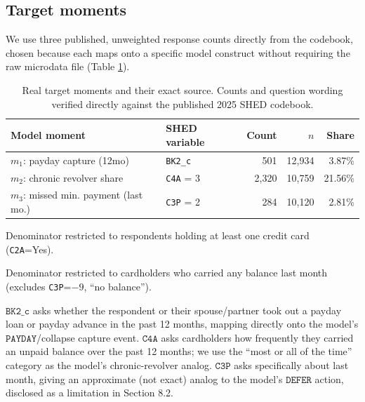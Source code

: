 \documentclass[12pt]{article}
\begin{document}
\subsection{Target moments}

We use three published, unweighted response counts directly from the codebook, chosen because each maps onto a specific model construct without requiring the raw microdata file (Table \ref{tab:moments}).

\begin{table}[h]
\centering
\begin{threeparttable}
\begin{tabular}{@{}llrrr@{}}
\toprule
\textbf{Model moment} & \textbf{SHED variable} & \textbf{Count} & \textbf{$n$} & \textbf{Share} \\
\midrule
$m_1$: payday capture (12mo) & \texttt{BK2\_c} & 501 & 12,934 & 3.87\% \\
$m_2$: chronic revolver share & \texttt{C4A} = 3 & 2,320 & 10,759\tnote{a} & 21.56\% \\
$m_3$: missed min. payment (last mo.) & \texttt{C3P} = 2 & 284 & 10,120\tnote{b} & 2.81\% \\
\bottomrule
\end{tabular}
\begin{tablenotes}
\small
\item[a] Denominator restricted to respondents holding at least one credit card (\texttt{C2A}=Yes).
\item[b] Denominator restricted to cardholders who carried any balance last month (excludes \texttt{C3P}=$-9$, ``no balance'').
\end{tablenotes}
\end{threeparttable}
\caption{Real target moments and their exact source. Counts and question wording verified directly against the published 2025 SHED codebook.}
\label{tab:moments}
\end{table}

$\texttt{BK2\_c}$ asks whether the respondent or their spouse/partner took out a payday loan or payday advance in the past 12 months, mapping directly onto the model's $\texttt{PAYDAY}$/collapse capture event. $\texttt{C4A}$ asks cardholders how frequently they carried an unpaid balance over the past 12 months; we use the ``most or all of the time'' category as the model's chronic-revolver analog. $\texttt{C3P}$ asks specifically about last month, giving an approximate (not exact) analog to the model's $\texttt{DEFER}$ action, disclosed as a limitation in Section 8.2.
\end{document}
